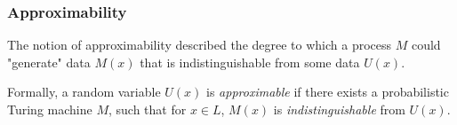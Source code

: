 %
%
%
%
%
%
%
%


%
%
%
%
%

\subsubsection{Approximability}%

The notion of approximability described the degree to which a process $M$ could "generate" data $M(x)$ that is indistinguishable from some data $U(x)$.

Formally, a random variable $U(x)$ is \textit{approximable} if there exists a probabilistic Turing machine $M$, such that for $x \in L$, $M(x)$ is \textit{indistinguishable} from $U(x)$.

